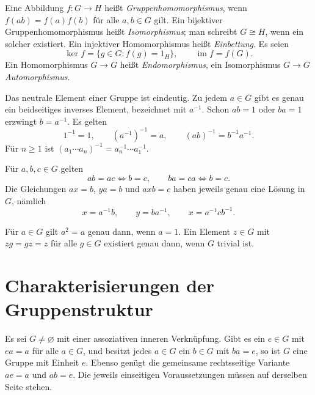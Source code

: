 \begin{definition}
Eine Abbildung \(f:G\to H\) heißt \emph{Gruppenhomomorphismus}, wenn
\(f(ab)=f(a)f(b)\) für alle \(a,b\in G\) gilt.
Ein bijektiver Gruppenhomomorphismus heißt \emph{Isomorphismus};
man schreibt \(G\cong H\), wenn ein solcher existiert.
Ein injektiver Homomorphismus heißt \emph{Einbettung}.
Es seien
\[
 \ker f=\{g\in G:f(g)=1_H\},\qquad
 \operatorname{im}f=f(G).
\]
Ein Homomorphismus \(G\to G\) heißt \emph{Endomorphismus},
ein Isomorphismus \(G\to G\) \emph{Automorphismus}.
\end{definition}

\begin{theorem}
Das neutrale Element einer Gruppe ist eindeutig. Zu jedem \(a\in G\)
gibt es genau ein beidseitiges inverses Element, bezeichnet mit \(a^{-1}\).
Schon \(ab=1\) oder \(ba=1\) erzwingt \(b=a^{-1}\).
Es gelten
\[
 1^{-1}=1,\qquad (a^{-1})^{-1}=a,\qquad
 (ab)^{-1}=b^{-1}a^{-1}.
\]
Für \(n\geq1\) ist
\((a_1\cdots a_n)^{-1}=a_n^{-1}\cdots a_1^{-1}\).
\cite{project40,milne}
\end{theorem}

\begin{theorem}
Für \(a,b,c\in G\) gelten
\[
 ab=ac\iff b=c,\qquad ba=ca\iff b=c.
\]
Die Gleichungen \(ax=b\), \(ya=b\) und \(axb=c\) haben jeweils genau eine
Lösung in \(G\), nämlich
\[
 x=a^{-1}b,\qquad y=ba^{-1},\qquad x=a^{-1}cb^{-1}.
\]
\cite{project40,milne}
\end{theorem}

\begin{theorem}
Für \(a\in G\) gilt \(a^2=a\) genau dann, wenn \(a=1\).
Ein Element \(z\in G\) mit \(zg=gz=z\) für alle \(g\in G\)
existiert genau dann, wenn \(G\) trivial ist. \cite{project40}
\end{theorem}

\section{Charakterisierungen der Gruppenstruktur}

\begin{theorem}
Es sei \(G\ne\varnothing\) mit einer assoziativen inneren Verknüpfung.
Gibt es ein \(e\in G\) mit \(ea=a\) für alle \(a\in G\), und besitzt jedes
\(a\in G\) ein \(b\in G\) mit \(ba=e\), so ist \(G\) eine Gruppe mit
Einheit \(e\). Ebenso genügt die gemeinsame rechtsseitige Variante
\(ae=a\) und \(ab=e\).
Die jeweils einseitigen Voraussetzungen müssen auf derselben Seite stehen.
\cite{une}
\end{theorem}

